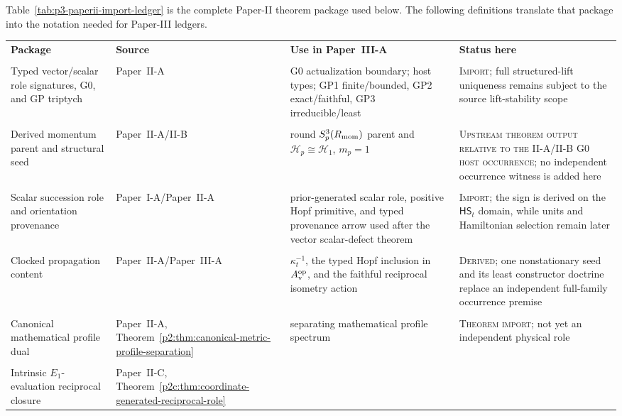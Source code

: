\documentclass[12pt,a4paper]{article}
\begin{document}
Table~\ref{tab:p3-paperii-import-ledger} is the complete Paper-II theorem package used below.  The following definitions translate that package into the notation needed for Paper-III ledgers.


\begin{table}[H]
\centering
\scriptsize
\begingroup
\setlength{\tabcolsep}{3pt}
\renewcommand{\arraystretch}{1.16}
\begin{tabular}{@{}L{3.1cm}L{3.6cm}L{4.0cm}L{4.0cm}@{}}
\toprule
\textbf{Package} & \textbf{Source} & \textbf{Use in Paper~III-A} & \textbf{Status here} \\\\
\midrule
Typed vector/scalar role signatures, G0, and GP triptych
& Paper~II-A
& G0 actualization boundary; host types; GP1 finite/bounded, GP2 exact/faithful, GP3 irreducible/least
& \textsc{Import}; full structured-lift uniqueness remains subject to the source lift-stability scope \\\\
Derived momentum parent and structural seed
& Paper~II-A/II-B
& round $S^3_p(R_{\mathrm{mom}})$ parent and $\mathcal H_p\cong\mathcal H_1$, $m_p=1$
& \textsc{Upstream theorem output relative to the II-A/II-B G0 host occurrence}; no independent occurrence witness is added here \\\\
Scalar succession role and orientation provenance
& Paper~I-A/Paper~II-A
& prior-generated scalar role, positive Hopf primitive, and typed provenance arrow used after the vector scalar-defect theorem
& \textsc{Import}; the sign is derived on the \(\mathsf{HS}_t\) domain, while units and Hamiltonian selection remain later \\\\
Clocked propagation content
& Paper~II-A/Paper~III-A
& \(\kappa_t^{-1}\), the typed Hopf inclusion in \(A_{\rm v}^{\rm op}\), and the faithful reciprocal isometry action
& \textsc{Derived}; one nonstationary seed and its least constructor doctrine replace an independent full-family occurrence premise \\\\
Canonical mathematical profile dual
& Paper~II-A, Theorem~\ref{p2:thm:canonical-metric-profile-separation}
& separating mathematical profile spectrum
& \textsc{Theorem import}; not yet an independent physical role \\\\
Intrinsic \(E_1\)-evaluation reciprocal closure
& Paper~II-C, Theorem~\ref{p2c:thm:coordinate-generated-reciprocal-role}

\end{tabular}
\end{table}
\end{document}
